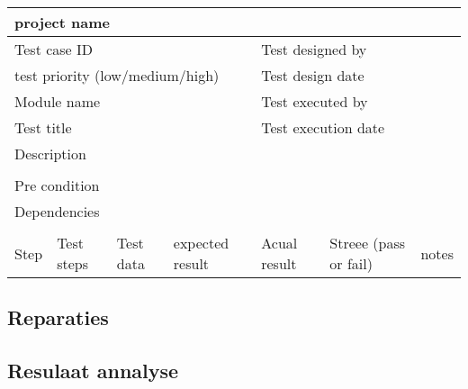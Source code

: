 		\begin{tabular}{|l|l|l|l|l|l|l|} \hline
			\multicolumn{7}{|l|}{project name}                                                               \\ \hline
			\multicolumn{4}{|l|}{Test case ID}   &\multicolumn{3}{|l|}{Test designed by}                           \\ \hline
			\multicolumn{4}{|l|}{test priority (low/medium/high)}   &\multicolumn{3}{|l|}{Test design date}                           \\ \hline
			\multicolumn{4}{|l|}{Module name}   &\multicolumn{3}{|l|}{Test executed by}                           \\ \hline
			\multicolumn{4}{|l|}{Test title}   &\multicolumn{3}{|l|}{Test execution date}                           \\ \hline
			\multicolumn{4}{|l|}{Description}   &\multicolumn{3}{|l|}{ }                           \\ \hline 		
			\multicolumn{7}{|l|}{ }   																\\ \hline
			\multicolumn{7}{|l|}{Pre condition}                                                               \\ \hline
			\multicolumn{7}{|l|}{Dependencies}                                                               \\ \hline
			\multicolumn{7}{|l|}{ }   															\\ \hline
			Step  &  Test steps & Test data & expected result &Acual result &Streee (pass or fail)&notes  \\ \hline
			
		\end{tabular}
		
		
		
		
		
		
		
		\subsection{Reparaties}
		
		\subsection{Resulaat annalyse}
		
		\lipsum[2-4]
		\begin{figure}[t]
			\centering
			\hfil
			
			\hfil
			\caption{}
			
			
			\label{fig: 2.2}
		\end{figure}
		
